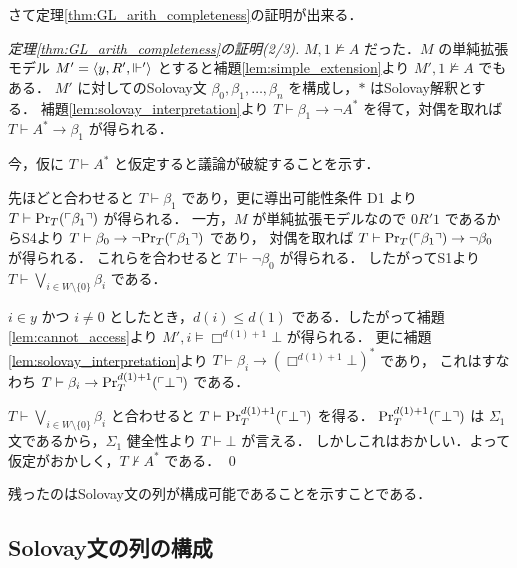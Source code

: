 \documentclass{jsarticle}
\begin{document}
さて定理\ref{thm:GL_arith_completeness}の証明が出来る．

\begin{proof}[定理\ref{thm:GL_arith_completeness}の証明(2/3)]
	$M,1 \nvDash A$ だった．$M$ の単純拡張モデル $M' = \langle y, R', \Vdash' \rangle$ とすると補題\ref{lem:simple_extension}より $M',1 \nvDash A$ でもある．
	$M'$ に対してのSolovay文 $\beta_0, \beta_1, \dots, \beta_n$ を構成し，$*$ はSolovay解釈とする．
	補題\ref{lem:solovay_interpretation}より $T \vdash \beta_1 \to \lnot A^*$ を得て，対偶を取れば $T \vdash A^* \to \beta_1$ が得られる．

	今，仮に $T \vdash A^*$ と仮定すると議論が破綻することを示す．

	先ほどと合わせると $T \vdash \beta_1$ であり，更に導出可能性条件 D1 より $T \vdash \mathrm{Pr}_T(\ulcorner \beta_1 \urcorner)$ が得られる．
	一方，$M$ が単純拡張モデルなので $0 R' 1$ であるからS4より $T \vdash \beta_0 \to \lnot \mathrm{Pr}_T(\ulcorner \beta_1 \urcorner)$ であり，
	対偶を取れば $T \vdash \mathrm{Pr}_T(\ulcorner \beta_1 \urcorner) \to \lnot \beta_0$ が得られる．
	これらを合わせると $T \vdash \lnot \beta_0$ が得られる．
	したがってS1より $T \vdash \bigvee_{i \in W \setminus \{0\}} \beta_i$ である．

	$i \in y$ かつ $i \neq 0$ としたとき，$d(i) \leq d(1)$ である．したがって補題 \ref{lem:cannot_access}より
	$M',i \vDash \Box^{d(1) + 1} \bot$ が得られる．
	更に補題\ref{lem:solovay_interpretation}より $T \vdash \beta_i \to (\Box^{d(1) + 1} \bot)^*$ であり，
	これはすなわち $T \vdash \beta_{i} \to \mathrm{Pr}^{d(1) + 1}_T(\ulcorner \bot \urcorner)$ である．

	$T \vdash \bigvee_{i \in W \setminus \{0\}} \beta_i$ と合わせると $T \vdash \mathrm{Pr}^{d(1) + 1}_T(\ulcorner \bot \urcorner)$ を得る．
	$\mathrm{Pr}^{d(1) + 1}_T(\ulcorner \bot \urcorner)$ は $\Sigma_1$ 文であるから，$\Sigma_1$ 健全性より $T \vdash \bot$ が言える．
	しかしこれはおかしい．よって仮定がおかしく，$T \nvdash A^*$ である．
	\qed
\end{proof}

残ったのはSolovay文の列が構成可能であることを示すことである．

\subsection{Solovay文の列の構成}

\printbibliography

\printindex
\end{document}
